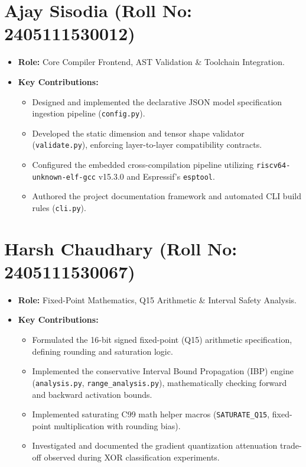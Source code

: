 \documentclass[12pt,a4paper]{report}
\begin{document}
\section{Ajay Sisodia (Roll No: 2405111530012)}
\begin{itemize}
    \item \textbf{Role:} Core Compiler Frontend, AST Validation \& Toolchain Integration.
    \item \textbf{Key Contributions:}
    \begin{itemize}
        \item Designed and implemented the declarative JSON model specification ingestion pipeline (\texttt{config.py}).
        \item Developed the static dimension and tensor shape validator (\texttt{validate.py}), enforcing layer-to-layer compatibility contracts.
        \item Configured the embedded cross-compilation pipeline utilizing \texttt{riscv64-unknown-elf-gcc} v15.3.0 and Espressif's \texttt{esptool}.
        \item Authored the project documentation framework and automated CLI build rules (\texttt{cli.py}).
    \end{itemize}
\end{itemize}

\section{Harsh Chaudhary (Roll No: 2405111530067)}
\begin{itemize}
    \item \textbf{Role:} Fixed-Point Mathematics, Q15 Arithmetic \& Interval Safety Analysis.
    \item \textbf{Key Contributions:}
    \begin{itemize}
        \item Formulated the 16-bit signed fixed-point (Q15) arithmetic specification, defining rounding and saturation logic.
        \item Implemented the conservative Interval Bound Propagation (IBP) engine (\texttt{analysis.py}, \texttt{range\_analysis.py}), mathematically checking forward and backward activation bounds.
        \item Implemented saturating C99 math helper macros (\texttt{SATURATE\_Q15}, fixed-point multiplication with rounding bias).
        \item Investigated and documented the gradient quantization attenuation trade-off observed during XOR classification experiments.
    \end{itemize}
\end{itemize}
\end{document}
